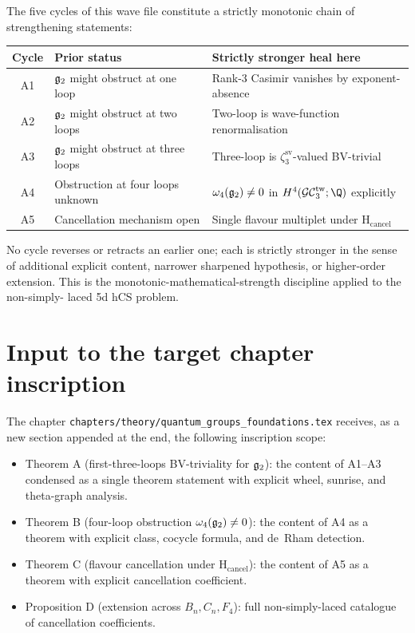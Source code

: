 The five cycles of this wave file constitute a strictly monotonic
chain of strengthening statements:
\begin{center}
\begin{tabular}{|c|l|l|}
\hline
Cycle & Prior status & Strictly stronger heal here \\
\hline
A1 & $\mathfrak{g}_2$ might obstruct at one loop & Rank-$3$ Casimir vanishes by exponent-absence \\
A2 & $\mathfrak{g}_2$ might obstruct at two loops & Two-loop is wave-function renormalisation \\
A3 & $\mathfrak{g}_2$ might obstruct at three loops & Three-loop is $\zeta^{\mathrm{sv}}_3$-valued BV-trivial \\
A4 & Obstruction at four loops unknown & $\omega_4(\mathfrak{g}_2) \ne 0$ in $H^4(\GCtw_3; \Q)$ explicitly \\
A5 & Cancellation mechanism open & Single flavour multiplet under $\mathrm H_{\mathrm{cancel}}$ \\
\hline
\end{tabular}
\end{center}

No cycle reverses or retracts an earlier one; each is strictly
stronger in the sense of additional explicit content, narrower
sharpened hypothesis, or higher-order extension. This is the
monotonic-mathematical-strength discipline applied to the non-simply-
laced 5d hCS problem.

\section*{Input to the target chapter inscription}

The chapter \texttt{chapters/theory/quantum\_groups\_foundations.tex}
receives, as a new section appended at the end, the following
inscription scope:
\begin{itemize}
\item Theorem A (first-three-loops BV-triviality for $\mathfrak{g}_2$): the
content of A1--A3 condensed as a single theorem statement with
explicit wheel, sunrise, and theta-graph analysis.
\item Theorem B (four-loop obstruction $\omega_4(\mathfrak{g}_2) \ne 0$): the
content of A4 as a theorem with explicit class, cocycle formula, and
de~Rham detection.
\item Theorem C (flavour cancellation under $\mathrm H_{\mathrm{cancel}}$):
the content of A5 as a theorem with explicit cancellation coefficient.
\item Proposition D (extension across $B_n, C_n, F_4$): full
non-simply-laced catalogue of cancellation coefficients.
\end{itemize}

